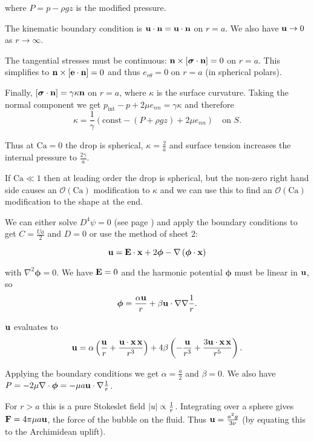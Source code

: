 \documentclass{notes}
\newcommand{\cO}{\mathcal{O}}
\newcommand{\Ca}{\mathrm{Ca}}
\newcommand{\bs}{\boldsymbol{\sigma}}
\newcommand{\e}{\mathbf{e}}
\theoremstyle{plain}
\begin{document}
where $P = p - \rho g z$ is the modified pressure.

The kinematic boundary condition is $\mathbf{u} \cdot \mathbf{n} = \mathbf{u} \cdot \mathbf{n}$ on $r = a$.
We also have $\mathbf{u} \to 0$ as $r \to \infty$.

The tangential stresses must be continuous: $\vn \times \left[ \bs \cdot \vn
\right] = 0$ on $r = a$.  This simplifies to $\vn \times \left[ \e \cdot \vn
\right] = 0$ and thus $e_{r \theta} = 0$ on $r = a$ (in spherical polars).

Finally, $\left[ \bs \cdot \vn \right] = \gamma \kappa \vn$ on $r = a$,
where $\kappa$ is the surface curvature.  Taking the normal component
we get $p_{\text{int}} -p + 2 \mu e_{n n} = \gamma \kappa$ and therefore
\[
\kappa = \frac{1}{\gamma} \left( \text{const} - \left(P + \rho g z
\right) + 2 \mu e_{nn} \right) \quad \text{on } S.
\]

Thus at $\Ca = 0$ the drop is spherical, $\kappa = \frac{2}{a}$ and
surface tension increases the internal pressure to $\frac{2 \gamma}{a}$.

If $\Ca \ll 1$ then at leading order the drop is spherical, but the non-zero
right hand side causes an $\cO(\Ca)$ modification to $\kappa$ and we
can use this to find an $\cO(\Ca)$ modification to the shape at the end.

We can either solve $D^4 \psi = 0$ (see page \pageref{ref:sphereflow})
and apply the boundary conditions to get $C = \frac{U a}{2}$ and
$D = 0$ or use the method of sheet 2:

\newcommand{\bp}{\boldsymbol{\phi}}

\[
\vu = \vect{E} \cdot \vx + 2 \bp - \nabla \left( \bp \cdot \vx \right)
\]

with $\nabla^2 \bp = 0$.   We have $\mathbf{E} = 0$ and the harmonic potential
$\bp$ must be linear in $\mathbf{u}$, so
\[
\bp = \frac{\alpha \vu}{r} + \beta \vu \cdot \nabla \nabla \frac{1}{r}.
\]

$\mathbf{u}$ evaluates to
\[
\mathbf{u} = \alpha \left( \frac{\mathbf{u}}{r} + \frac{\mathbf{u} \cdot \mathbf{x}\, \mathbf{x}}{r^3} \right)
+ 4 \beta \left( - \frac{\mathbf{u}}{r^3} + \frac{3 \mathbf{u} \cdot \mathbf{x}\, \mathbf{x}}{r^5}\right).
\]

Applying the boundary conditions we get $\alpha = \frac{a}{2}$ and $\beta =0$.
We also have $P = - 2 \mu \nabla \cdot \bp = - \mu a \vu \cdot \nabla
\frac{1}{r}$.

For $r > a$ this is a pure Stokeslet field $\left|u\right| \propto \frac{1}{r}$.
Integrating over a sphere gives $\mathbf{F} = 4 \pi \mu a \mathbf{u}$, the force of the
bubble on the fluid.  Thus $\mathbf{u} = \frac{a^2 g}{3 \nu}$ (by equating this
to the Archimidean uplift).
\end{document}
